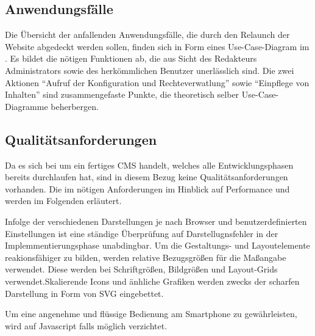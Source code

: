 \subsection{Anwendungsfälle}
\label{sec:Anwendungsfaelle}

Die Übersicht der anfallenden Anwendungsfälle, die durch den Relaunch der
Website abgedeckt werden sollen, finden sich in Form eines Use-Case-Diagram
im . Es bildet die nötigen Funktionen ab, die aus Sicht
des Redakteurs \bzw Administrators sowie des herkömmlichen Benutzer unerlässlich
sind. Die zwei Aktionen "`Aufruf der Konfiguration und Rechteverwatlung"' sowie
"`Einpflege von Inhalten"' sind zusammengefaste Punkte, die theoretisch selber
Use-Case-Diagramme beherbergen.

\subsection{Qualitätsanforderungen}
\label{sec:Qualitaetsanforderungen}

Da es sich bei \ct um ein fertiges \ac{CMS} handelt, welches alle
Entwicklungsphasen bereits durchlaufen hat, sind in diesem Bezug keine
Qualitätsanforderungen vorhanden. Die im  nötigen
Anforderungen im Hinblick auf Performance und  werden im
Folgenden erläutert.

Infolge der verschiedenen Darstellungen je nach Browser und
benutzerdefinierten Einstellungen ist eine ständige Überprüfung auf
Darstellugnsfehler in der Implemmentierungsphase unabdingbar.
Um die Gestaltungs- und Layoutelemente reakionsfähiger zu bilden, werden
relative Bezugsgrößen für die Maßangabe verwendet. Diese werden \zB bei
Schriftgrößen, Bildgrößen und Layout-Grids verwendet.Skalierende Icons und 
änhliche Grafiken werden zwecks der scharfen Darstellung in Form von \ac{SVG}
eingebettet.

Um eine angenehme und flüssige Bedienung am Smartphone zu gewährleisten, wird
auf Javascript falls möglich verzichtet.

